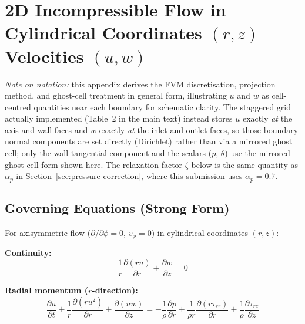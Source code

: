 
\section{2D Incompressible Flow in Cylindrical Coordinates $(r,z)$ --- Velocities $(u,w)$}
\label{sec:cyl_uw}

\emph{Note on notation:} this appendix derives the FVM discretisation, projection method,
and ghost-cell treatment in general form, illustrating $u$ and $w$ as cell-centred quantities
near each boundary for schematic clarity. The staggered grid actually implemented (Table~2 in
the main text) instead stores $u$ exactly \emph{at} the axis and wall faces and $w$ exactly
\emph{at} the inlet and outlet faces, so those boundary-normal components are set directly
(Dirichlet) rather than via a mirrored ghost cell; only the wall-tangential component and the
scalars ($p$, $\theta$) use the mirrored ghost-cell form shown here. The relaxation factor
$\zeta$ below is the same quantity as $\alpha_p$ in Section~\ref{sec:pressure-correction},
where this submission uses $\alpha_p = 0.7$.

\subsection{Governing Equations (Strong Form)}

For axisymmetric flow ($\partial/\partial\phi = 0$, $v_\phi = 0$) in cylindrical coordinates $(r,z)$:

\textbf{Continuity:}
\begin{equation}
    \frac{1}{r}\frac{\partial(ru)}{\partial r}+\frac{\partial w}{\partial z}
    = 0
    \label{eq:cyl_uw_cont}
\end{equation}

\textbf{Radial momentum ($r$-direction):}
\begin{equation}
    \frac{\partial u}{\partial t}
    + \frac{1}{r}\frac{\partial(ru^2)}{\partial r}
    + \frac{\partial(uw)}{\partial z}
    = -\frac{1}{\rho}\frac{\partial p}{\partial r}
    + \frac{1}{\rho r}\frac{\partial(r\tau_{rr})}{\partial r}
    + \frac{1}{\rho}\frac{\partial\tau_{rz}}{\partial z}
    \label{eq:cyl_uw_momr}
\end{equation}

